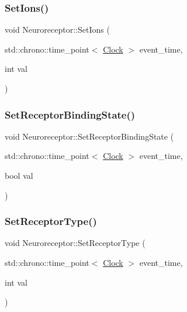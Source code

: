 \mbox{\label{classNeuroreceptor_a36a548475e752631130a2b4ec67c66b6}} 
\subsubsection{\texorpdfstring{Set\+Ions()}{SetIons()}}
{\footnotesize\ttfamily void Neuroreceptor\+::\+Set\+Ions (\begin{DoxyParamCaption}\item[{std\+::chrono\+::time\+\_\+point$<$ \mbox{\hyperlink{universe_8h_a0ef8d951d1ca5ab3cfaf7ab4c7a6fd80}{Clock}} $>$}]{event\+\_\+time,  }\item[{int}]{val }\end{DoxyParamCaption})\hspace{0.3cm}{\ttfamily [inline]}}

\mbox{\label{classNeuroreceptor_a75adddd7e615af57b8f3f841ec25463c}} 
\subsubsection{\texorpdfstring{Set\+Receptor\+Binding\+State()}{SetReceptorBindingState()}}
{\footnotesize\ttfamily void Neuroreceptor\+::\+Set\+Receptor\+Binding\+State (\begin{DoxyParamCaption}\item[{std\+::chrono\+::time\+\_\+point$<$ \mbox{\hyperlink{universe_8h_a0ef8d951d1ca5ab3cfaf7ab4c7a6fd80}{Clock}} $>$}]{event\+\_\+time,  }\item[{bool}]{val }\end{DoxyParamCaption})\hspace{0.3cm}{\ttfamily [inline]}}

\mbox{\label{classNeuroreceptor_a0e6e88d6c5b357872f055edbddb54d4c}} 
\subsubsection{\texorpdfstring{Set\+Receptor\+Type()}{SetReceptorType()}}
{\footnotesize\ttfamily void Neuroreceptor\+::\+Set\+Receptor\+Type (\begin{DoxyParamCaption}\item[{std\+::chrono\+::time\+\_\+point$<$ \mbox{\hyperlink{universe_8h_a0ef8d951d1ca5ab3cfaf7ab4c7a6fd80}{Clock}} $>$}]{event\+\_\+time,  }\item[{int}]{val }\end{DoxyParamCaption})\hspace{0.3cm}{\ttfamily [inline]}}

